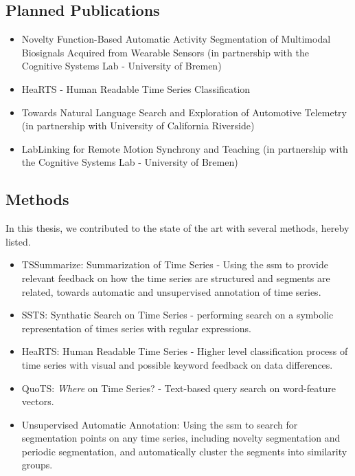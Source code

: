 \subsection{Planned Publications}

\begin{itemize}
\item Novelty Function-Based Automatic Activity Segmentation of Multimodal Biosignals Acquired from Wearable Sensors (in partnership with the Cognitive Systems Lab - University of Bremen)

\item HeaRTS - Human Readable Time Series Classification

\item Towards Natural Language Search and Exploration of Automotive Telemetry (in partnership with University of California Riverside)

\item LabLinking for Remote Motion Synchrony and Teaching (in partnership with the Cognitive Systems Lab - University of Bremen)

\end{itemize}

\subsection{Methods}

In this thesis, we contributed to the state of the art with several methods, hereby listed.

\begin{itemize}

\item TSSummarize: Summarization of Time Series - Using the \gls{ssm} to provide relevant feedback on how the time series are structured and segments are related, towards automatic and unsupervised annotation of time series.

\item SSTS: Synthatic Search on Time Series - performing search on a symbolic representation of times series with regular expressions.

\item HeaRTS: Human Readable Time Series - Higher level classification process of time series with visual and possible keyword feedback on data differences.

\item QuoTS: \textit{Where} on Time Series? - Text-based query search on word-feature vectors. 

\item Unsupervised Automatic Annotation: Using the \gls{ssm} to search for segmentation points on any time series, including novelty segmentation and periodic segmentation, and automatically cluster the segments into similarity groups.

\end{itemize}

